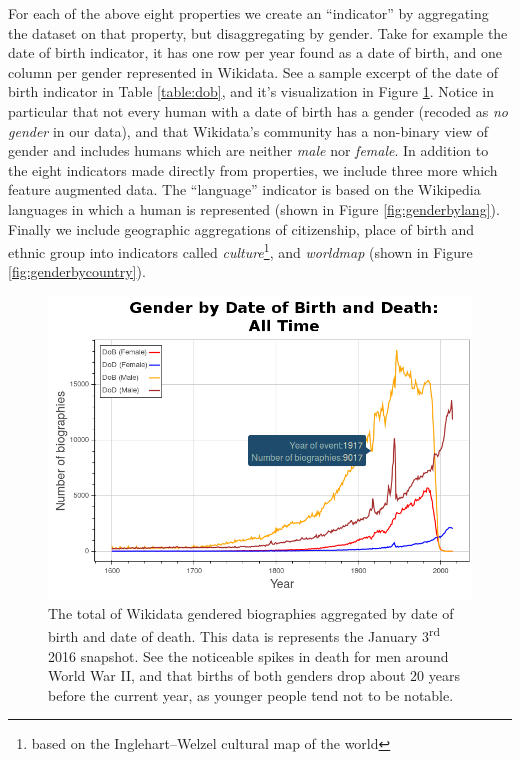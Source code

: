 \documentclass{sig-alternate-05-2015}
\begin{document}
For each of the above eight properties we create an ``indicator'' by aggregating the dataset on that property, but disaggregating by gender. Take for example the date of birth indicator, it has one row per year found as a date of birth, and one column per gender represented in Wikidata. See a sample excerpt of the date of birth indicator in Table \ref{table:dob}, and it's visualization in Figure \ref{fig:genderbydob}. Notice in particular that not every human with a date of birth has a gender (recoded as \textit{no gender} in our data), and that Wikidata's community has a non-binary view of gender and includes humans which are neither \textit{male} nor \textit{female}. In addition to the eight indicators made directly from properties, we include three more which feature augmented data. The ``language'' indicator is based on the Wikipedia languages in which a human is represented (shown in Figure \ref{fig:genderbylang}). Finally we include geographic aggregations of citizenship, place of birth and ethnic group into indicators called \textit{culture}\footnote{based on the Inglehart–Welzel cultural map of the world}, and \textit{worldmap} (shown in Figure \ref{fig:genderbycountry}).


\begin{figure}
\includegraphics[width=\columnwidth]{figures/genderbydob.png} 
\caption{The total of Wikidata gendered biographies aggregated by date of birth and date of death. This data is represents the January 3\textsuperscript{rd} 2016 snapshot. See the noticeable spikes in death for men around World War II, and that births of both genders drop about 20 years before the current year, as younger people tend not to be notable.}
\label{fig:genderbydob}
\end{figure}
\end{document}
